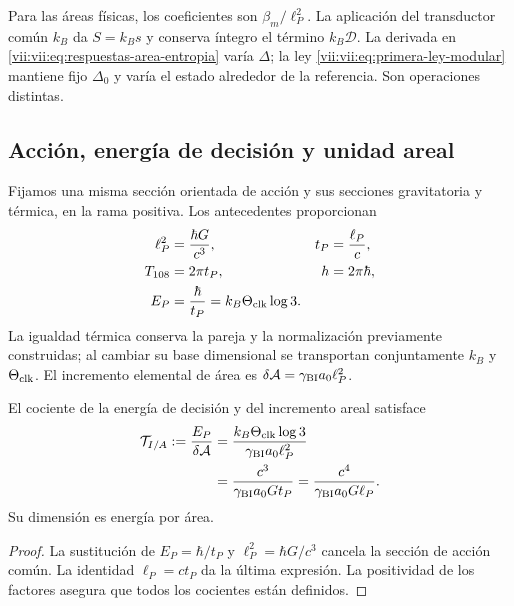 Para las áreas físicas, los coeficientes son \(\beta_m/\ell_P^2\).
La aplicación del transductor común \(k_B\) da \(S=k_Bs\) y
conserva íntegro el término \(k_B\mathcal D\). La derivada en
\eqref{vii:vii:eq:respuestas-area-entropia} varía \(\Delta\); la ley
\eqref{vii:vii:eq:primera-ley-modular} mantiene fijo \(\Delta_0\) y
varía el estado alrededor de la referencia. Son operaciones distintas.

\subsection{Acción, energía de decisión y unidad areal}
\label{vii:vii:subsec:conversion-informacion-area}

Fijamos una misma sección orientada de acción y sus secciones gravitatoria
y térmica, en la rama positiva. Los antecedentes proporcionan
\begin{equation}
 \begin{aligned}
 \ell_P^2&=\frac{\hbar G}{c^3},& t_P&=\frac{\ell_P}{c},\\
 T_{108}&=2\pi t_P,& h&=2\pi\hbar,\\
 E_P&=\frac{\hbar}{t_P}=k_B\Theta_{\rm clk}\log3.&&
 \end{aligned}
 \label{vii:vii:eq:unidad-accion-informacion}
\end{equation}
La igualdad térmica conserva la pareja y la normalización previamente
construidas; al cambiar su base dimensional se transportan conjuntamente
\(k_B\) y \(\Theta_{\rm clk}\). El incremento elemental de área es
\(\delta\mathcal A=\gamma_{\rm BI}a_0\ell_P^2\).

\begin{proposition}
\label{vii:vii:prop:tension-informacion-area}
El cociente de la energía de decisión y del incremento areal satisface
\begin{equation}
 \begin{aligned}
 \mathcal T_{I/A}:=\frac{E_P}{\delta\mathcal A}
 &=\frac{k_B\Theta_{\rm clk}\log3}{\gamma_{\rm BI}a_0\ell_P^2}\\
 &=\frac{c^3}{\gamma_{\rm BI}a_0G t_P}
  =\frac{c^4}{\gamma_{\rm BI}a_0G\ell_P}.
 \end{aligned}
 \label{vii:vii:eq:tension-informacion-area}
\end{equation}
Su dimensión es energía por área.
\end{proposition}
\begin{proof}
La sustitución de \(E_P=\hbar/t_P\) y
\(\ell_P^2=\hbar G/c^3\) cancela la sección de acción común.
La identidad \(\ell_P=ct_P\) da la última expresión. La positividad
de los factores asegura que todos los cocientes están definidos.
\end{proof}

